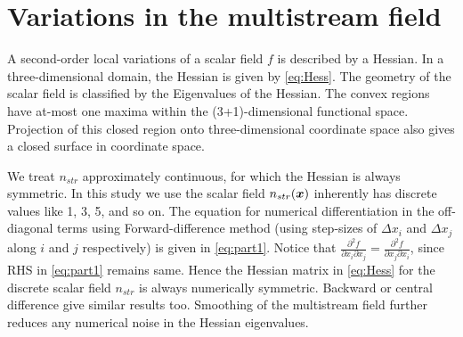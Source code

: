 \documentclass[fleqn,usenatbib,useAMS]{mnras}
\begin{document}
\section{Variations in the multistream field}
\label{appendix:Eigen}

A second-order local variations of a scalar field $f$ is described by a Hessian. In a three-dimensional domain, the Hessian is given by \autoref{eq:Hess}. The geometry of the scalar field is classified by the Eigenvalues of the Hessian. The convex regions have at-most one maxima within the (3+1)-dimensional functional space. Projection of this closed region onto three-dimensional coordinate space also gives a closed surface in coordinate space. 

We treat $n_{str}$ approximately continuous, for which the Hessian is always symmetric. In this study we use the scalar field $n_{str}(\bmath{x})$ inherently has discrete values like 1, 3, 5, and so on. The equation for numerical differentiation in the off-diagonal terms using Forward-difference method (using step-sizes of $\Delta x_i$ and $\Delta x_j$ along $i$ and $j$ respectively) is given in \autoref{eq:part1}. Notice that $\frac{\partial^2 f}{\partial x_i \partial x_j} = \frac{\partial^2 f}{\partial x_j \partial x_i}$, since RHS in \autoref{eq:part1} remains same. Hence the Hessian matrix in \autoref{eq:Hess} for the discrete scalar field $n_{str}$ is always numerically symmetric. Backward or central difference give similar results too. Smoothing of the multistream field further reduces any numerical noise in the Hessian eigenvalues.
\end{document}
